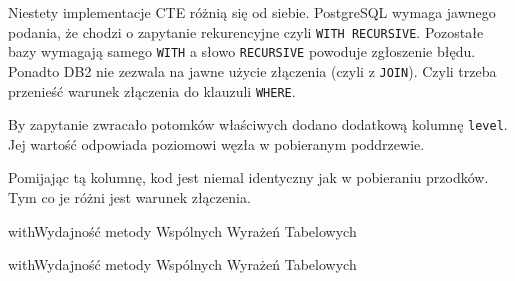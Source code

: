 

Niestety implementacje CTE różnią się od siebie.
PostgreSQL wymaga jawnego podania, że chodzi o zapytanie rekurencyjne czyli \texttt{WITH RECURSIVE}.
Pozostałe bazy wymagają samego \texttt{WITH} a słowo \texttt{RECURSIVE} powoduje zgłoszenie błędu.
Ponadto DB2 nie zezwala na jawne użycie złączenia (czyli z \texttt{JOIN}).
Czyli trzeba przenieść warunek złączenia do klauzuli \texttt{WHERE}.




By zapytanie zwracało potomków właściwych dodano dodatkową kolumnę \texttt{level}.
Jej wartość odpowiada poziomowi węzła w pobieranym poddrzewie.

Pomijając tą kolumnę, kod jest niemal identyczny jak w pobieraniu przodków.
Tym co je różni jest warunek złączenia.

%



\begin{qxtab}{with}{Wydajność metody Wspólnych Wyrażeń Tabelowych}
\end{qxtab}

\begin{qxfig}{with}{Wydajność metody Wspólnych Wyrażeń Tabelowych}
\end{qxfig}












